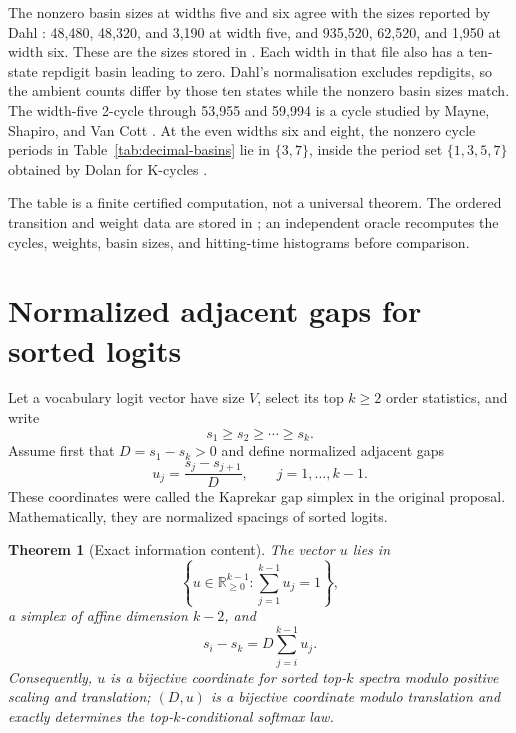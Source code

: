 \documentclass[11pt]{article}
\newtheorem{theorem}{Theorem}[section]
\theoremstyle{definition}
\theoremstyle{remark}
\newcommand{\R}{\mathbb{R}}
\newcommand{\1}{\mathbf{1}}
\begin{document}
The nonzero basin sizes at widths five and six agree with the sizes reported
by Dahl \cite{dahl2026}: 48,480, 48,320, and 3,190 at width five, and 935,520,
62,520, and 1,950 at width six.  These are the sizes stored in
.  Each width in that file also has a
ten-state repdigit basin leading to zero.  Dahl's normalisation excludes
repdigits, so the ambient counts differ by those ten states while the nonzero
basin sizes match.  The width-five 2-cycle through 53,955 and 59,994 is a
cycle studied by Mayne, Shapiro, and Van Cott \cite{mayne2026}.  At the even
widths six and eight, the nonzero cycle periods in
Table~\ref{tab:decimal-basins} lie in $\{3,7\}$, inside the period set
$\{1,3,5,7\}$ obtained by Dolan for K-cycles \cite{dolan2026kcycles}.

The table is a finite certified computation, not a universal theorem.  The
ordered transition and weight data are stored in
; an independent oracle recomputes the
cycles, weights, basin sizes, and hitting-time histograms before comparison.

\FloatBarrier
\section{Normalized adjacent gaps for sorted logits}

Let a vocabulary logit vector have size $V$, select its top $k\geq2$ order
statistics, and write
\[
  s_1\geq s_2\geq\cdots\geq s_k.
\]
Assume first that $D=s_1-s_k>0$ and define normalized adjacent gaps
\begin{equation}\label{eq:logit-gaps}
  u_j=\frac{s_j-s_{j+1}}{D},
  \qquad j=1,\ldots,k-1.
\end{equation}
These coordinates were called the Kaprekar gap simplex in the original
proposal.  Mathematically, they are normalized spacings of sorted logits.

\begin{theorem}[Exact information content]\label{thm:logit-reconstruction}
The vector $u$ lies in
\[
  \left\{u\in\R_{\geq0}^{k-1}:\sum_{j=1}^{k-1}u_j=1\right\},
\]
a simplex of affine dimension $k-2$, and
\begin{equation}\label{eq:logit-reconstruction}
  s_i-s_k=D\sum_{j=i}^{k-1}u_j.
\end{equation}
Consequently, $u$ is a bijective coordinate for sorted top-$k$ spectra modulo
positive scaling and translation; $(D,u)$ is a bijective coordinate modulo
translation and exactly determines the top-$k$-conditional softmax law.
\end{theorem}
\end{document}
